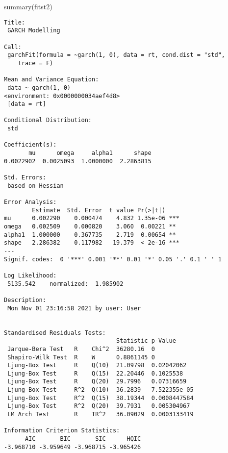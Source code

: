 \documentclass[
  ignorenonframetext,
]{beamer}
\newenvironment{Shaded}{\begin{snugshade}}{\end{snugshade}}
\newcommand{\FunctionTok}[1]{\textcolor[rgb]{0.00,0.00,0.00}{#1}}
\newcommand{\NormalTok}[1]{#1}
\begin{document}
\begin{frame}[fragile]
\begin{Shaded}
\begin{Highlighting}[]
\FunctionTok{summary}\NormalTok{(fitst2)}
\end{Highlighting}
\end{Shaded}

\begin{verbatim}
Title:
 GARCH Modelling 

Call:
 garchFit(formula = ~garch(1, 0), data = rt, cond.dist = "std", 
    trace = F) 

Mean and Variance Equation:
 data ~ garch(1, 0)
<environment: 0x0000000034aef4d8>
 [data = rt]

Conditional Distribution:
 std 

Coefficient(s):
       mu      omega     alpha1      shape  
0.0022902  0.0025093  1.0000000  2.2863815  

Std. Errors:
 based on Hessian 

Error Analysis:
        Estimate  Std. Error  t value Pr(>|t|)    
mu      0.002290    0.000474    4.832 1.35e-06 ***
omega   0.002509    0.000820    3.060  0.00221 ** 
alpha1  1.000000    0.367735    2.719  0.00654 ** 
shape   2.286382    0.117982   19.379  < 2e-16 ***
---
Signif. codes:  0 '***' 0.001 '**' 0.01 '*' 0.05 '.' 0.1 ' ' 1

Log Likelihood:
 5135.542    normalized:  1.985902 

Description:
 Mon Nov 01 23:16:58 2021 by user: User 


Standardised Residuals Tests:
                                Statistic p-Value     
 Jarque-Bera Test   R    Chi^2  36280.16  0           
 Shapiro-Wilk Test  R    W      0.8861145 0           
 Ljung-Box Test     R    Q(10)  21.09798  0.02042062  
 Ljung-Box Test     R    Q(15)  22.20446  0.1025538   
 Ljung-Box Test     R    Q(20)  29.7996   0.07316659  
 Ljung-Box Test     R^2  Q(10)  36.2839   7.522355e-05
 Ljung-Box Test     R^2  Q(15)  38.19344  0.0008447584
 Ljung-Box Test     R^2  Q(20)  39.7931   0.005304967 
 LM Arch Test       R    TR^2   36.09029  0.0003133419

Information Criterion Statistics:
      AIC       BIC       SIC      HQIC 
-3.968710 -3.959649 -3.968715 -3.965426 
\end{verbatim}
\end{frame}
\end{document}
